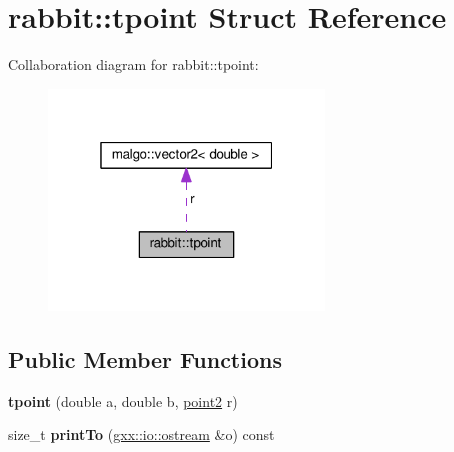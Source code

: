 \hypertarget{structrabbit_1_1tpoint}{}\section{rabbit\+:\+:tpoint Struct Reference}
\label{structrabbit_1_1tpoint}


Collaboration diagram for rabbit\+:\+:tpoint\+:
\nopagebreak
\begin{figure}[H]
\begin{center}
\leavevmode
\includegraphics[width=208pt]{structrabbit_1_1tpoint__coll__graph}
\end{center}
\end{figure}
\subsection*{Public Member Functions}
\begin{DoxyCompactItemize}
\item 
{\bfseries tpoint} (double a, double b, \hyperlink{classmalgo_1_1vector2}{point2} r)\hypertarget{structrabbit_1_1tpoint_acdbc903be31f23b57e4e781da5f88b59}{}\label{structrabbit_1_1tpoint_acdbc903be31f23b57e4e781da5f88b59}

\item 
size\+\_\+t {\bfseries print\+To} (\hyperlink{classgxx_1_1io_1_1ostream}{gxx\+::io\+::ostream} \&o) const \hypertarget{structrabbit_1_1tpoint_ac3da06794e55d99efdc5fb1b0c65ea3a}{}\label{structrabbit_1_1tpoint_ac3da06794e55d99efdc5fb1b0c65ea3a}

\end{DoxyCompactItemize}
